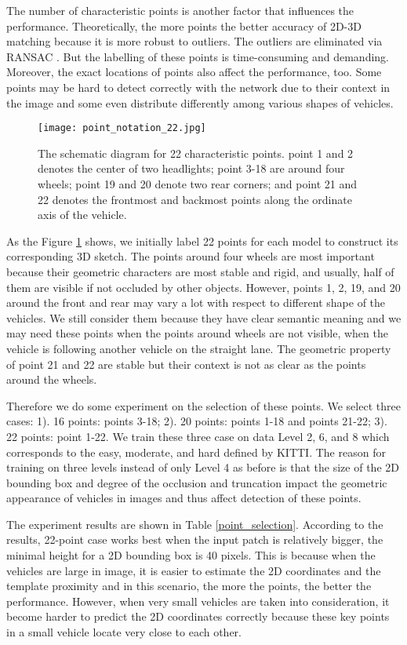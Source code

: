 The number of characteristic points is another factor that influences the performance. Theoretically, the more points the better accuracy of 2D-3D matching because it is more robust to outliers. The outliers are eliminated via RANSAC \cite{Fischler:1981:RSC:358669.358692}. But the labelling of these points is time-consuming and demanding. Moreover, the exact locations of points also affect the performance, too. Some points may be hard to detect correctly with the network due to their context in the image and some even distribute differently among various shapes of vehicles. 

\begin{figure}[ht]		
	\texttt{[image: point\_notation\_22.jpg]}
	\caption{The schematic diagram for 22 characteristic points. point 1 and 2 denotes the center of two headlights; point 3-18 are around four wheels; point 19 and 20 denote two rear corners; and point 21 and 22 denotes the frontmost and  backmost points along the ordinate axis of the vehicle.}
	\centering
	\label{figure:point_notation_22}
\end{figure}

As the Figure \ref{figure:point_notation_22} shows, we initially label 22 points for each model to construct its corresponding 3D sketch. The points around four wheels are most important because their geometric characters are most stable and rigid, and usually, half of them are visible if not occluded by other objects. However, points 1, 2, 19, and 20 around the front and rear may vary a lot with respect to different shape of the vehicles. We still consider them because they have clear semantic meaning and we may need these points when the points around wheels are not visible, \eg when the vehicle is following another vehicle on the straight lane. The geometric property of point 21 and 22 are stable but their context is not as clear as the points around the wheels.

Therefore we do some experiment on the selection of these points. We select three cases: 1). 16 points: points 3-18; 2). 20 points: points 1-18 and points 21-22; 3). 22 points: point 1-22. We train these three case on data Level 2, 6, and 8 which corresponds to the easy, moderate, and hard defined by KITTI. The reason for training on three levels instead of only Level 4 as before is that the size of the 2D bounding box and degree of the occlusion and truncation impact the geometric appearance of vehicles in images and thus affect detection of these points.

The experiment results are shown in Table \ref{point_selection}.  According to the results, 22-point case works best when the input patch is relatively bigger, \ie the minimal height for a 2D bounding box is 40 pixels. This is because when the vehicles are large in image, it is easier to estimate the 2D coordinates and the template proximity and in this scenario, the more the points, the better the performance. However, when very small vehicles are taken into consideration, it become harder to predict the 2D coordinates correctly because these key points in a small vehicle locate very close to each other. 

